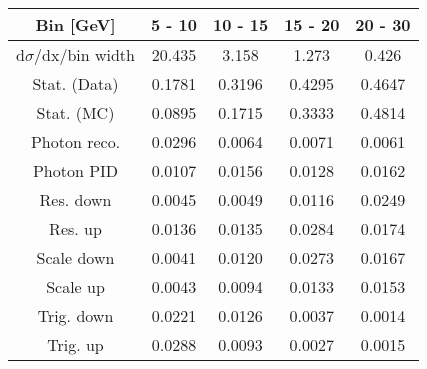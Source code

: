 \documentclass{article}
\begin{document}
\begin{table}[H]
\begin{tabular}{|c|c|c|c|c|}
\hline
Bin [GeV] & 5 - 10 & 10 - 15 & 15 - 20 & 20 - 30 \\
\hline
d$\sigma$/dx/bin width & 20.435 & 3.158 & 1.273 & 0.426 \\
\hline
Stat. (Data) & 0.1781 & 0.3196 & 0.4295 & 0.4647 \\
\hline
Stat. (MC) & 0.0895 & 0.1715 & 0.3333 & 0.4814 \\
\hline
Photon reco. & 0.0296 & 0.0064 & 0.0071 & 0.0061 \\
\hline
Photon PID & 0.0107 & 0.0156 & 0.0128 & 0.0162 \\
\hline
Res. down & 0.0045 & 0.0049 & 0.0116 & 0.0249 \\
\hline
Res. up & 0.0136 & 0.0135 & 0.0284 & 0.0174 \\
\hline
Scale down & 0.0041 & 0.0120 & 0.0273 & 0.0167 \\
\hline
Scale up & 0.0043 & 0.0094 & 0.0133 & 0.0153 \\
\hline
Trig. down & 0.0221 & 0.0126 & 0.0037 & 0.0014 \\
\hline
Trig. up & 0.0288 & 0.0093 & 0.0027 & 0.0015 \\
\hline
\end{tabular}
\end{table}
\end{document}
